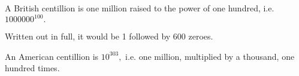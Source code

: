A British centillion is one million raised to 
the power of one hundred, i.e. $1000000^{100}.$ 
\par
Written out in full, it would be 1 followed by 600 zeroes.
\par
An American centillion is $10^{303},$  i.e. one million,
multiplied by a thousand, one hundred times.